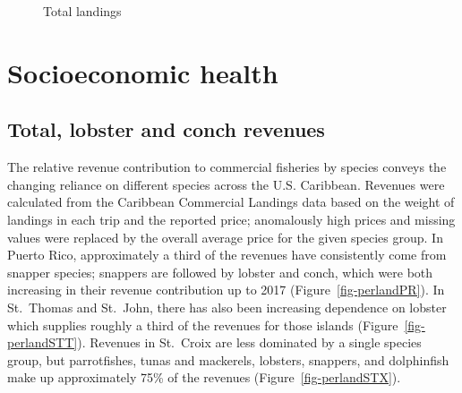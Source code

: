 \documentclass[
  letterpaper,
  oneside,
  open=any]{scrbook}
\begin{document}
\begin{figure}


\caption{\label{fig-totalland}Total landings}

\end{figure}%

\section{Socioeconomic health}\label{socioeconomic-health}

\subsection{Total, lobster and conch
revenues}\label{total-lobster-and-conch-revenues}

The relative revenue contribution to commercial fisheries by species
conveys the changing reliance on different species across the U.S.
Caribbean. Revenues were calculated from the Caribbean Commercial
Landings data based on the weight of landings in each trip and the
reported price; anomalously high prices and missing values were replaced
by the overall average price for the given species group. In Puerto
Rico, approximately a third of the revenues have consistently come from
snapper species; snappers are followed by lobster and conch, which were
both increasing in their revenue contribution up to 2017
(Figure~\ref{fig-perlandPR}). In St.~Thomas and St.~John, there has also
been increasing dependence on lobster which supplies roughly a third of
the revenues for those islands (Figure~\ref{fig-perlandSTT}). Revenues
in St.~Croix are less dominated by a single species group, but
parrotfishes, tunas and mackerels, lobsters, snappers, and dolphinfish
make up approximately 75\% of the revenues
(Figure~\ref{fig-perlandSTX}).
\end{document}
